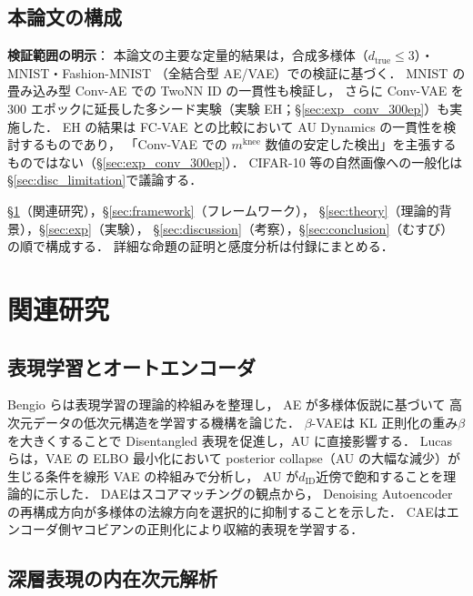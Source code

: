 \documentclass[11pt,a4paper]{jsarticle}
\newcommand{\mknee}{m^{\mathrm{knee}}}
\begin{document}
\subsection{本論文の構成}\label{sec:intro_structure}

\textbf{検証範囲の明示}：
本論文の主要な定量的結果は，合成多様体（$d_{\mathrm{true}} \leq 3$）・MNIST・Fashion-MNIST
（全結合型 AE/VAE）での検証に基づく．
MNIST の畳み込み型 Conv-AE での TwoNN ID の一貫性も検証し，
さらに Conv-VAE を 300 エポックに延長した多シード実験（実験 EH；§\ref{sec:exp_conv_300ep}）も実施した．
EH の結果は FC-VAE との比較において AU Dynamics の一貫性を検討するものであり，
「Conv-VAE での $\mknee$ 数値の安定した検出」を主張するものではない（§\ref{sec:exp_conv_300ep}）．
CIFAR-10 等の自然画像への一般化は§\ref{sec:disc_limitation}で議論する．

§\ref{sec:related}（関連研究），§\ref{sec:framework}（フレームワーク），
§\ref{sec:theory}（理論的背景），§\ref{sec:exp}（実験），
§\ref{sec:discussion}（考察），§\ref{sec:conclusion}（むすび）の順で構成する．
詳細な命題の証明と感度分析は付録にまとめる．

\section{関連研究}\label{sec:related}

\subsection{表現学習とオートエンコーダ}\label{sec:related_ae}

Bengio ら\cite{bengio2013representation}は表現学習の理論的枠組みを整理し，
AE が多様体仮説\cite{fefferman2016manifold}に基づいて
高次元データの低次元構造を学習する機構を論じた．
$\beta$-VAE\cite{higgins2017betavae}は KL 正則化の重み$\beta$を大きくすることで
Disentangled 表現を促進し，AU に直接影響する．
Lucas ら\cite{lucas2019elbo}は，VAE の ELBO 最小化において
posterior collapse（AU の大幅な減少）が生じる条件を線形 VAE の枠組みで分析し，
AU が$d_{\mathrm{ID}}$近傍で飽和することを理論的に示した．
DAE\cite{alain2014dae}はスコアマッチングの観点から，
Denoising Autoencoder の再構成方向が多様体の法線方向を選択的に抑制することを示した．
CAE\cite{rifai2011cae}はエンコーダ側ヤコビアンの正則化により収縮的表現を学習する．

\subsection{深層表現の内在次元解析}\label{sec:related_id}
\end{document}
